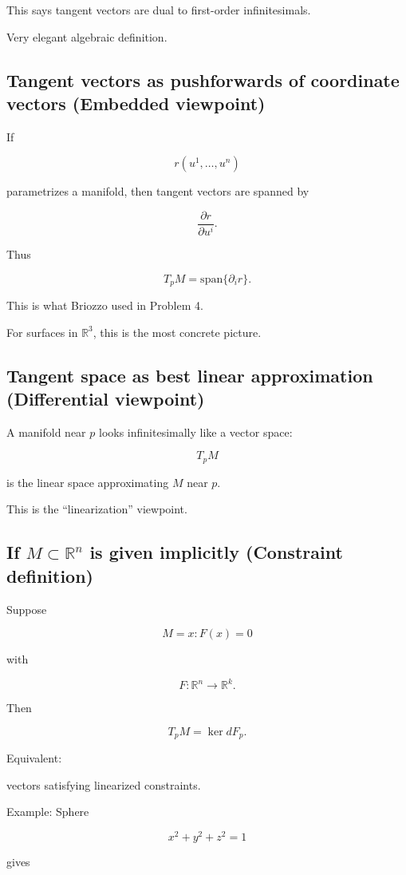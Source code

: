 \documentclass[aps,prl,twocolumn,groupedaddress]{revtex4-2}
\begin{document}
This says tangent vectors are dual to first-order infinitesimals.

Very elegant algebraic definition.

\subsection{Tangent vectors as pushforwards of coordinate vectors (Embedded viewpoint)}

If

$$
r(u^1,\dots,u^n)
$$

parametrizes a manifold, then tangent vectors are spanned by

$$
\frac{\partial r}{\partial u^i}.
$$

Thus

$$
T_pM
=
\text{span}
\{
\partial_i r
\}
.
$$

This is what Briozzo used in Problem 4.

For surfaces in $\mathbb R^3$, this is the most concrete picture.

\subsection{Tangent space as best linear approximation (Differential viewpoint)}

A manifold near $p$ looks infinitesimally like a vector space:

$$
T_pM
$$

is the linear space approximating $M$ near $p$.

This is the ``linearization'' viewpoint.

\subsection{If $M\subset \mathbb R^n$ is given implicitly (Constraint definition)}

Suppose

$$
M={x:F(x)=0}
$$

with

$$
F:\mathbb R^n\to \mathbb R^k.
$$

Then

$$
T_pM
=
\ker dF_p.
$$

Equivalent:

vectors satisfying linearized constraints.

Example:
Sphere

$$
x^2+y^2+z^2=1
$$

gives
\end{document}
